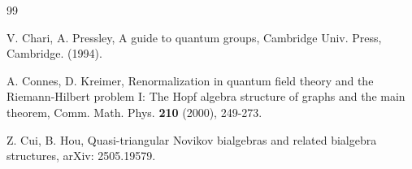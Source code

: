 \documentclass[12pt]{amsart}
\begin{document}
\begin{thebibliography}{99}

V. Chari, A. Pressley,  A guide to quantum groups, Cambridge Univ. Press, Cambridge. (1994).



A. Connes,  D. Kreimer, Renormalization in quantum field theory
and the Riemann-Hilbert problem I: The Hopf algebra structure of
graphs and the main theorem, Comm. Math. Phys. {\bf210} (2000),
249-273.

Z. Cui,  B. Hou, Quasi-triangular Novikov bialgebras and related
bialgebra structures,  arXiv: 2505.19579.











\end{thebibliography}
\end{document}
